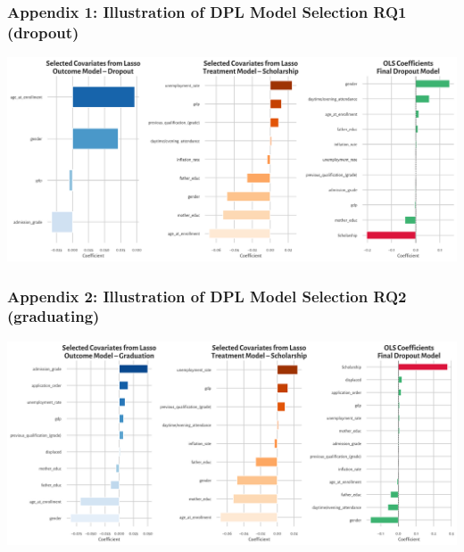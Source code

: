 \documentclass[aspectratio=169]{beamer}
\begin{document}
\appendix

\begin{frame}
  \frametitle{Appendix 1: Illustration of DPL Model Selection RQ1 (dropout)}
  \hypertarget{appendix-slide}{}
  \vspace{10pt}
  \centering
  \includegraphics[width=1\linewidth]{Tex_Pictures/DPL_RQ1_model_selection}
  \vfill
  \raggedleft
  \hyperlink{main-slide}{}
\end{frame}  

\begin{frame}
  \frametitle{Appendix 2: Illustration of DPL Model Selection RQ2 (graduating)}
  \hypertarget{appendix-slide2}{}
  \vspace{10pt}
  \centering
  \includegraphics[width=1\linewidth]{Tex_Pictures/DPL_RQ2_model_selection}
  \vfill
  \raggedleft
  \hyperlink{main-slide2}{}
\end{frame}
\end{document}
